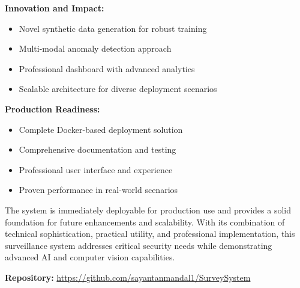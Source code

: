 \documentclass[12pt,a4paper]{article}
\begin{document}
\textbf{Innovation and Impact:}
\begin{itemize}
    \item Novel synthetic data generation for robust training
    \item Multi-modal anomaly detection approach
    \item Professional dashboard with advanced analytics
    \item Scalable architecture for diverse deployment scenarios
\end{itemize}

\textbf{Production Readiness:}
\begin{itemize}
    \item Complete Docker-based deployment solution
    \item Comprehensive documentation and testing
    \item Professional user interface and experience
    \item Proven performance in real-world scenarios
\end{itemize}

The system is immediately deployable for production use and provides a solid foundation for future enhancements and scalability. With its combination of technical sophistication, practical utility, and professional implementation, this surveillance system addresses critical security needs while demonstrating advanced AI and computer vision capabilities.

\textbf{Repository:} \url{https://github.com/sayantanmandal1/SurveySystem}
\end{document}
